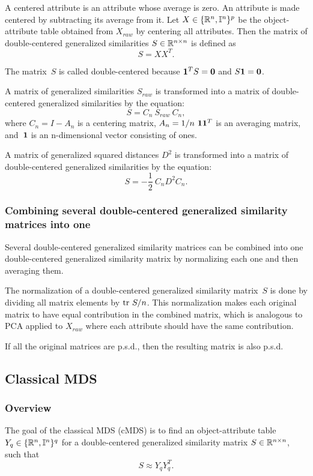 \documentclass[10pt,a4paper]{article}
\begin{document}
A centered attribute is an attribute whose average is zero. 
An attribute is made centered by subtracting its average from it. 
Let $X \in \{\mathbb R^n,\mathbb I^n\}^p$ be the object-attribute table obtained from $X_{raw}$ by centering all attributes. 
Then the matrix of double-centered generalized similarities $S \in \mathbb R^{n \times n}$ is defined as
$$ S = X X^T. $$

The matrix~$S$ is called double-centered because $\mathbf 1^TS = \mathbf 0$ and $S \mathbf 1 = \mathbf 0$.

A matrix of generalized similarities $S_{raw}$ is transformed into a matrix of double-centered generalized similarities by the equation:
$$ S = C_n \ S_{raw} \ C_n, $$
where $C_n = I - A_n$ is a centering matrix, 
$A_n = 1/n \ \mathbf 1 \mathbf 1^T$ is an averaging matrix,
and~$\mathbf 1$ is an n-dimensional vector consisting of ones.

A matrix of generalized squared distances $D^2$ is transformed into a matrix of double-centered generalized similarities by the equation:
$$ S = - \frac 1 2 \ C_n D^2 C_n. $$


\subsubsection {Combining several double-centered generalized similarity matrices into one}

Several double-centered generalized similarity matrices can be combined into one double-centered generalized similarity matrix by normalizing each one and then averaging them. 

The normalization of a double-centered generalized similarity matrix~$S$ is done by dividing all matrix elements by $\mathrm {tr} \  S/n$. 
This normalization makes each original matrix to have equal contribution in the combined matrix, 
which is analogous to PCA applied to $X_{raw}$ where each attribute should have the same contribution. 

If all the original matrices are p.s.d., then the resulting matrix is also p.s.d.


\subsection {Classical MDS}

\subsubsection{Overview}

The goal of the classical MDS (cMDS) is to find an object-attribute table $Y_q \in \{\mathbb R^n,\mathbb I^n\}^q$ for a double-centered generalized similarity matrix $S \in \mathbb R^{n \times n}$, 
such that
$$ S \approx Y_q Y_q^T. $$
\end{document}
